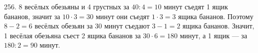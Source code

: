 256. 8 весёлых обезьяны и 4 грустных за $40:4=10$ минут съедят 1 ящик бананов, значит за $10\cdot3=30$ минут они съедят $1\cdot3=3$ ящика бананов. Поэтому $8-2=6$ весёлых обезьян за 30 минут съедают $3-1=2$ ящика бананов. Значит, 1 весёлая обезьяна съест 2 ящика бананов за $30\cdot6=180$ минут, а 1 ящик --- за $180:2=90$ минут.\\
